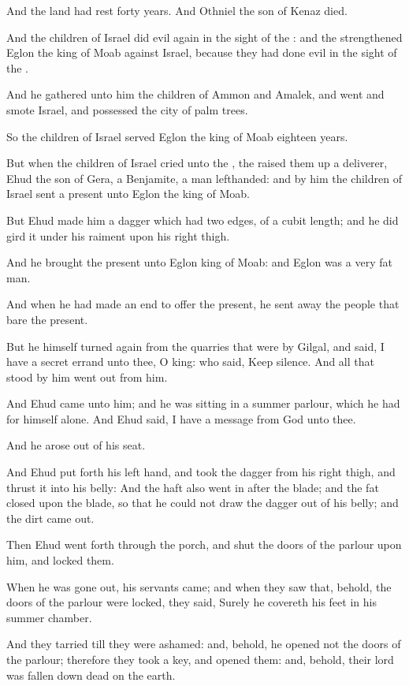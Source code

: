 \Verse And the land had rest forty years. And Othniel the son of Kenaz died.

\Verse And the children of Israel did evil again in the sight of the \LORD: and the \LORD strengthened Eglon the king of Moab against Israel, because they had done evil in the sight of the \LORD.

\Verse And he gathered unto him the children of Ammon and Amalek, and went and smote Israel, and possessed the city of palm trees.

\Verse So the children of Israel served Eglon the king of Moab eighteen years.

\Verse But when the children of Israel cried unto the \LORD, the \LORD raised them up a deliverer, Ehud the son of Gera, a Benjamite, a man lefthanded: and by him the children of Israel sent a present unto Eglon the king of Moab.

\Verse But Ehud made him a dagger which had two edges, of a cubit length; and he did gird it under his raiment upon his right thigh.

\Verse And he brought the present unto Eglon king of Moab: and Eglon was a very fat man.

\Verse And when he had made an end to offer the present, he sent away the people that bare the present.

\Verse But he himself turned again from the quarries that were by Gilgal, and said, I have a secret errand unto thee, O king: who said, Keep silence. And all that stood by him went out from him.

\Verse And Ehud came unto him; and he was sitting in a summer parlour, which he had for himself alone. And Ehud said, I have a message from God unto thee.

And he arose out of his seat.

\Verse And Ehud put forth his left hand, and took the dagger from his right thigh, and thrust it into his belly: \Verse And the haft also went in after the blade; and the fat closed upon the blade, so that he could not draw the dagger out of his belly; and the dirt came out.

\Verse Then Ehud went forth through the porch, and shut the doors of the parlour upon him, and locked them.

\Verse When he was gone out, his servants came; and when they saw that, behold, the doors of the parlour were locked, they said, Surely he covereth his feet in his summer chamber.

\Verse And they tarried till they were ashamed: and, behold, he opened not the doors of the parlour; therefore they took a key, and opened them: and, behold, their lord was fallen down dead on the earth.

